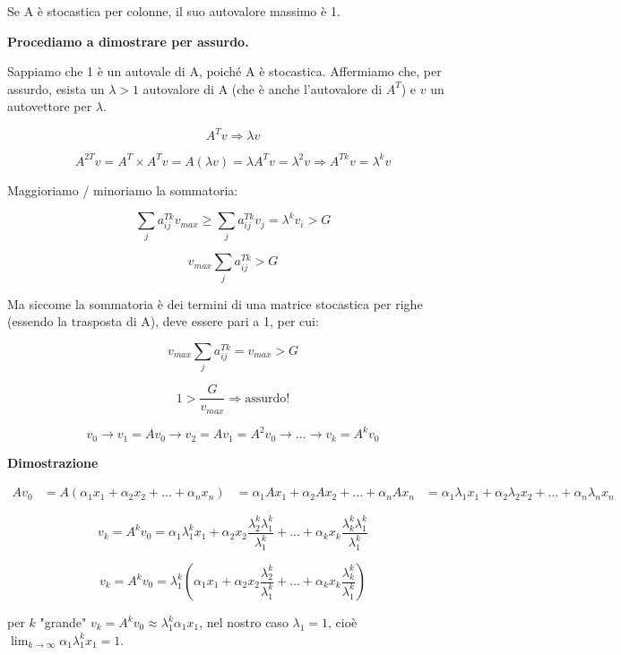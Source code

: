 \documentclass[\main/main.tex]{subfiles}
\begin{document}
\begin{theorem}
Se A è stocastica per colonne, il suo autovalore massimo è 1.

\textbf{Procediamo a dimostrare per assurdo.}

Sappiamo che 1 è un autovale di A, poiché A è stocastica. Affermiamo che, per assurdo, esista un $\lambda > 1$ autovalore di A (che è anche l'autovalore di $A^T$) e $v$ un autovettore per $\lambda$.

\[
	A^Tv \Rightarrow \lambda v
\]

\[
	A^{2T} v = A^T \times A^T v = A (\lambda v) = \lambda A^T v = \lambda ^2 v \Rightarrow A^{Tk} v = \lambda ^ k v
\]

Maggioriamo / minoriamo la sommatoria:

\[
	\sum_j a^{Tk}_{ij} v_{max} \geq \sum_j a_{ij}^{Tk} v_j = \lambda ^ k v_i > G
\]

\[
	v_{max} \sum_j a_{ij}^{Tk} > G
\]

Ma siccome la sommatoria è dei termini di una matrice stocastica per righe (essendo la trasposta di A), deve essere pari a 1, per cui:

\[
	v_{max} \sum_j a_{ij}^{Tk} = v_{max} > G
\]

\[
	1 > \dfrac{G}{v_{max}} \Rightarrow \text{assurdo!}
\]

\end{theorem}

\begin{theorem}
\[
	v_0 \rightarrow v_1 = A v_0 \rightarrow v_2 = A v_1 = A^2 v_0 \rightarrow ... \rightarrow v_k = A^k v_0	
\]

\textbf{Dimostrazione}

\begin{align*}
	A v_0 &= A(\alpha_1 x_1 + \alpha_2 x_2 + ... + \alpha_n x_n)
			 &= \alpha_1 A x_1 + \alpha_2 A x_2 + ... + \alpha_n A x_n
			 &= \alpha_1 \lambda_1 x_1 + \alpha_2 \lambda_2 x_2 + ... + \alpha_n \lambda_n x_n
\end{align*}

\[
	v_k = A^k v_0 = \alpha_1 \lambda_1^k x_1 +  \alpha_2 x_2  \dfrac{ \lambda_2^k \lambda_1^k}{ \lambda_1^k}+ ... +  \alpha_k x_k  \dfrac{ \lambda_k^k \lambda_1^k}{ \lambda_1^k}
\]

\[
	v_k = A^k v_0 =  \lambda_1^k (\alpha_1 x_1 +  \alpha_2 x_2  \dfrac{ \lambda_2^k}{ \lambda_1^k}+ ... +  \alpha_k x_k  \dfrac{ \lambda_k^k}{ \lambda_1^k})
\]

per $k$ "grande" $v_k = A^k v_0 \approx \lambda^k_1 \alpha_1 x_1$, nel nostro caso $\lambda_1 = 1$, cioè $\lim_{k \rightarrow \infty} \alpha_1 \lambda_1^k x_1 = 1$.

\end{theorem}
\end{document}
